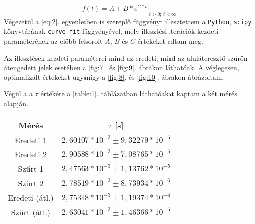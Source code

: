 \begin{multicols}{2}
\begin{equation}
f \left( t \right)
=
\left. A + B * e^{C * t} \right|_{t > 0;\ t < \infty}
\end{equation}
Végezetül a \ref{eq:2}. egyenletben is szereplő függvényt illesztettem a \texttt{Python}, \texttt{scipy} könyvtárának \texttt{curve\_fit} függvényével, mely illesztési iterációk kezdeti paraméterének az előbb felsorolt $A$, $B$ és $C$ értékeket adtam meg. \par
Az illesztések kezdeti paraméterei mind az eredeti, mind az aluláteresztő szűrőn átengedett jelek esetében a \ref{fig:7}. és \ref{fig:9}. ábrákon láthatóak. A véglegesen, optimalizált értékeket ugyanígy a \ref{fig:8}. és \ref{fig:10}. ábrákon ábrázoltam. \par
Végül a a $\tau$ értékére a \ref{table:1}. táblázatban láthatóakat kaptam a két mérés alapján.

\begin{center}
\begin{tabular}{|c|c|}
\hline
Mérés              & $\tau$ [s]                                \\ \hline \hline
Eredeti 1          & $2,60107 * 10^{-3} \pm 9,32279 * 10^{-5}$ \\ \hline
Eredeti 2          & $2,90588 * 10^{-3} \pm 7,08765 * 10^{-5}$ \\ \hline
Szűrt 1            & $2,47563 * 10^{-3} \pm 1,13762 * 10^{-5}$ \\ \hline
Szűrt 2            & $2,78519 * 10^{-3} \pm 8,73934 * 10^{-6}$ \\ \hline \hline
Eredeti (átl.)     & $2,75348 * 10^{-3} \pm 1,19374 * 10^{-4}$ \\ \hline
Szűrt (átl.)       & $2,63041 * 10^{-3} \pm 1,46366 * 10^{-5}$ \\ \hline
\end{tabular}
 \label{table:1}
\end{center}


\end{multicols}
